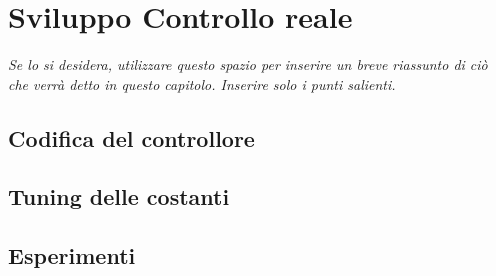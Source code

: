 \chapter{Sviluppo Controllo reale}\label{cap:controlDevelop}

\begin{minipage}{12cm}\textit{Se lo si desidera, utilizzare questo spazio per inserire un breve riassunto di ci\`o che verr\`a detto in questo capitolo. Inserire solo i punti salienti.}
\end{minipage}

\vspace*{1cm}

\section{Codifica del controllore}

\section{Tuning delle costanti}

\section{Esperimenti}